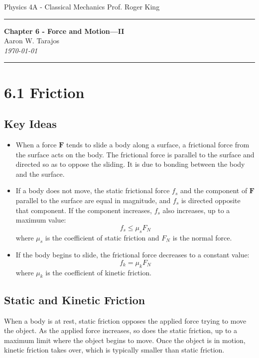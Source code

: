 \documentclass{article}
\begin{document}
\noindent
Physics 4A - Classical Mechanics \hfill Prof. Roger King

\noindent\rule{\textwidth}{0.4pt}

\begin{center}
    \textbf{\LARGE Chapter 6 - Force and Motion—II} \\
    \vspace{12pt}
    \large Aaron W. Tarajos \\
    \textit{\today}
\end{center}

\noindent\rule{\textwidth}{0.4pt}

\section*{6.1 Friction}

\subsection*{Key Ideas}
\begin{itemize}
    \item When a force $\mathbf{F}$ tends to slide a body along a surface, a frictional force from the surface acts on the body. The frictional force is parallel to the surface and directed so as to oppose the sliding. It is due to bonding between the body and the surface.
    \item If a body does not move, the static frictional force $f_s$ and the component of $\mathbf{F}$ parallel to the surface are equal in magnitude, and $f_s$ is directed opposite that component. If the component increases, $f_s$ also increases, up to a maximum value:
    \[
    f_s \leq \mu_s F_N
    \]
    where $\mu_s$ is the coefficient of static friction and $F_N$ is the normal force.
    \item If the body begins to slide, the frictional force decreases to a constant value:
    \[
    f_k = \mu_k F_N
    \]
    where $\mu_k$ is the coefficient of kinetic friction.
\end{itemize}

\subsection*{Static and Kinetic Friction}
When a body is at rest, static friction opposes the applied force trying to move the object. As the applied force increases, so does the static friction, up to a maximum limit where the object begins to move. Once the object is in motion, kinetic friction takes over, which is typically smaller than static friction.
\end{document}
